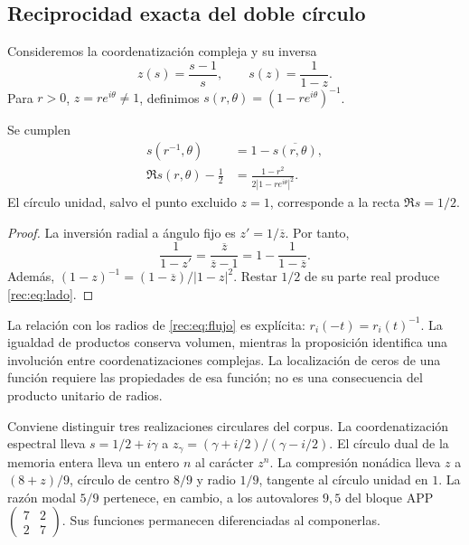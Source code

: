 \subsection{Reciprocidad exacta del doble círculo}
\label{rec:doble-circulo}

Consideremos la coordenatización compleja y su inversa
\[
 z(s)=\frac{s-1}{s},\qquad s(z)=\frac1{1-z}.
\]
Para \(r>0\), \(z=re^{i\theta}\ne1\), definimos \(s(r,\theta)=(1-re^{i\theta})^{-1}\).

\begin{proposition}
\label{rec:prop:espejo}
Se cumplen
\begin{align}
 s(r^{-1},\theta)&=1-\overline{s(r,\theta)},\label{rec:eq:espejo}\\
 \Re s(r,\theta)-\frac12&=
 \frac{1-r^2}{2|1-re^{i\theta}|^2}.\label{rec:eq:lado}
\end{align}
El círculo unidad, salvo el punto excluido \(z=1\), corresponde a la recta \(\Re s=1/2\).
\end{proposition}
\begin{proof}
La inversión radial a ángulo fijo es \(z'=1/\overline z\). Por tanto,
\[
 \frac1{1-z'}=\frac{\overline z}{\overline z-1}
 =1-\frac1{1-\overline z}.
\]
Además, \((1-z)^{-1}=(1-\overline z)/|1-z|^2\). Restar \(1/2\) de su parte real produce \eqref{rec:eq:lado}.
\end{proof}

La relación con los radios de \eqref{rec:eq:flujo} es explícita: \(r_i(-t)=r_i(t)^{-1}\). La igualdad de productos conserva volumen, mientras la proposición identifica una involución entre coordenatizaciones complejas. La localización de ceros de una función requiere las propiedades de esa función; no es una consecuencia del producto unitario de radios.

Conviene distinguir tres realizaciones circulares del corpus. La coordenatización espectral lleva \(s=1/2+i\gamma\) a \(z_\gamma=(\gamma+i/2)/(\gamma-i/2)\). El círculo dual de la memoria entera lleva un entero \(n\) al carácter \(z^n\). La compresión nonádica lleva \(z\) a \((8+z)/9\), círculo de centro \(8/9\) y radio \(1/9\), tangente al círculo unidad en \(1\). La razón modal \(5/9\) pertenece, en cambio, a los autovalores \(9,5\) del bloque APP \(\left(\begin{smallmatrix}7&2\\2&7\end{smallmatrix}\right)\). Sus funciones permanecen diferenciadas al componerlas.

